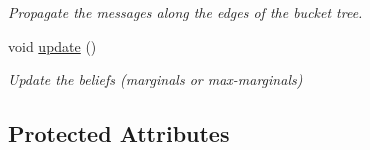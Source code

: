 \begin{DoxyCompactItemize}
\begin{DoxyCompactList}\small\item\em Propagate the messages along the edges of the bucket tree. \end{DoxyCompactList}\item 
void \hyperlink{classmerlin_1_1bte_a001577a8acc4c5101c882e364f470875}{update} ()\hypertarget{classmerlin_1_1bte_a001577a8acc4c5101c882e364f470875}{}\label{classmerlin_1_1bte_a001577a8acc4c5101c882e364f470875}

\begin{DoxyCompactList}\small\item\em Update the beliefs (marginals or max-\/marginals) \end{DoxyCompactList}\end{DoxyCompactItemize}
\subsection*{Protected Attributes}
